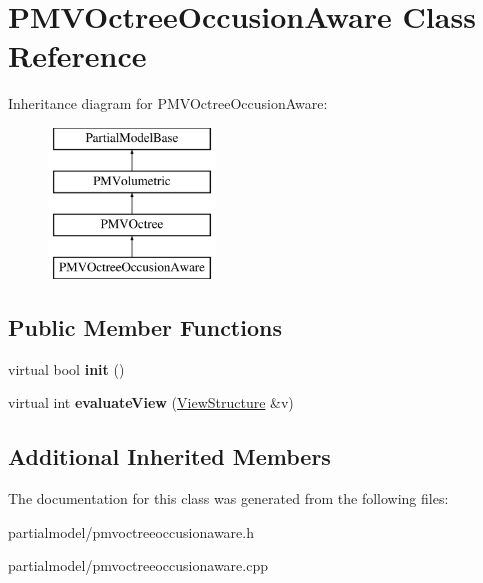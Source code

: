 \hypertarget{classPMVOctreeOccusionAware}{}\section{P\+M\+V\+Octree\+Occusion\+Aware Class Reference}
\label{classPMVOctreeOccusionAware}
Inheritance diagram for P\+M\+V\+Octree\+Occusion\+Aware\+:\begin{figure}[H]
\begin{center}
\leavevmode
\includegraphics[height=4.000000cm]{classPMVOctreeOccusionAware}
\end{center}
\end{figure}
\subsection*{Public Member Functions}
\begin{DoxyCompactItemize}
\item 
virtual bool {\bfseries init} ()\hypertarget{classPMVOctreeOccusionAware_ae561f09096386b5ef6ba2ea706624a3a}{}\label{classPMVOctreeOccusionAware_ae561f09096386b5ef6ba2ea706624a3a}

\item 
virtual int {\bfseries evaluate\+View} (\hyperlink{classViewStructure}{View\+Structure} \&v)\hypertarget{classPMVOctreeOccusionAware_a8c8057b9b19acf6270d73beac3cebe0b}{}\label{classPMVOctreeOccusionAware_a8c8057b9b19acf6270d73beac3cebe0b}

\end{DoxyCompactItemize}
\subsection*{Additional Inherited Members}


The documentation for this class was generated from the following files\+:\begin{DoxyCompactItemize}
\item 
partialmodel/pmvoctreeoccusionaware.\+h\item 
partialmodel/pmvoctreeoccusionaware.\+cpp\end{DoxyCompactItemize}
